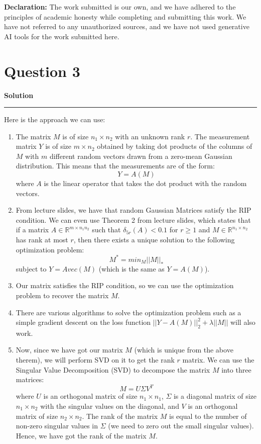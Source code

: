 \documentclass[a4paper,12pt]{article}
\title{\cooltitle{CS754 Assignment-4}}
\author{{\bf Saksham Rathi, Ekansh Ravi Shankar, Kshitij Vaidya}}
\date{}
\newenvironment{solution}[2][]{%
    \begin{mdframed}[linecolor=blue!70!black, linewidth=2pt, roundcorner=10pt, backgroundcolor=yellow!10!white, skipabove=12pt, skipbelow=12pt]%
        \textbf{\large #2}
        \par\noindent\rule{\textwidth}{0.4pt}
}{
    \end{mdframed}
}
\begin{document}
\maketitle
\textbf{Declaration:} The work submitted is our own, and
we have adhered to the principles of academic honesty while completing and submitting this work. We have not referred to any unauthorized sources, and we have not used generative AI tools for the work submitted here.

\section*{Question 3}

\begin{solution}{Solution}
Here is the approach we can use:
\begin{enumerate}
  \item The matrix $M$ is of size $n_1 \times n_2$ with an unknown rank $r$. The measurement matrix $Y$ is of size $m \times n_2$ obtained by taking dot products of the columns of $M$ with $m$ different random vectors drawn from a zero-mean Gaussian distribution. This means that the measurements are of the form:
  \[
  Y = A(M)
  \]
  where $A$ is the linear operator that takes the dot product with the random vectors.
  \item From lecture slides, we have that random Gaussian Matrices satisfy the RIP condition. We can even use Theorem 2 from lecture slides, which states that if a matrix $A \in \mathbb{R}^{m\times n_1n_2}$ such that $\delta_{5r}(A) < 0.1$ for $r \geq 1$ and $M \in \mathbb{R}^{n_1\times n_2}$ has rank at most $r$, then there exists a unique solution to the following optimization problem:
  \[M^* = min_M||M||_*\] 
  subject to $Y = Avec(M)$ (which is the same as $Y = A(M)$).
  \item Our matrix satisfies the RIP condition, so we can use the optimization problem to recover the matrix $M$.
  \item There are various algorithms to solve the optimization problem such as a simple gradient descent on the loss function $||Y - A(M)||_2^2 + \lambda ||M||$ will also work. 
  \item Now, since we have got our matrix $M$ (which is unique from the above therem), we will perform SVD on it to get the rank $r$ matrix. We can use the Singular Value Decomposition (SVD) to decompose the matrix $M$ into three matrices:
  \[ M = U \Sigma V^T \]
  where $U$ is an orthogonal matrix of size $n_1 \times n_1$, $\Sigma$ is a diagonal matrix of size $n_1 \times n_2$ with the singular values on the diagonal, and $V$ is an orthogonal matrix of size $n_2 \times n_2$. The rank of the matrix $M$ is equal to the number of non-zero singular values in $\Sigma$ (we need to zero out the small singular values). Hence, we have got the rank of the matrix $M$.
\end{enumerate}

\end{solution}
\end{document}
